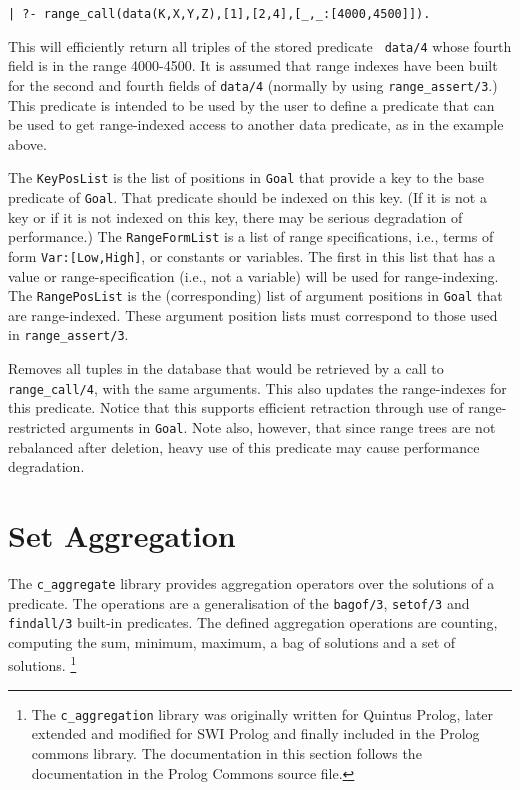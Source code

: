 \begin{description}
\begin{verbatim}
| ?- range_call(data(K,X,Y,Z),[1],[2,4],[_,_:[4000,4500]]).
\end{verbatim}

This will efficiently return all triples of the stored predicate {\tt
  data/4} whose fourth field is in the range 4000-4500.  It is assumed
that range indexes have been built for the second and fourth fields of
{\tt data/4} (normally by using {\tt range\_assert/3}.)  This
predicate is intended to be used by the user to define a predicate
that can be used to get range-indexed access to another data
predicate, as in the example above.

The {\tt KeyPosList} is the list of positions in {\tt Goal} that
provide a key to the base predicate of {\tt Goal}.  That predicate
should be indexed on this key.  (If it is not a key or if it is not
indexed on this key, there may be serious degradation of performance.)
The {\tt RangeFormList} is a list of range specifications, i.e., terms
of form {\tt Var:[Low,High]}, or constants or variables.  The first in
this list that has a value or range-specification (i.e., not a
variable) will be used for range-indexing.  The {\tt RangePosList} is
the (corresponding) list of argument positions in {\tt Goal} that are
range-indexed.  These argument position lists must correspond to those
used in {\tt range\_assert/3}. 

%
Removes all tuples in the database that would be retrieved by a call
to {\tt range\_call/4}, with the same arguments.  This also updates
the range-indexes for this predicate.  Notice that this supports
efficient retraction through use of range-restricted arguments in
{\tt Goal}.  Note also, however, that since range trees are not
rebalanced after deletion, heavy use of this predicate may cause
performance degradation.  

\end{description}

\section{Set Aggregation}

The {\tt c\_aggregate} library provides aggregation operators over the
solutions of a predicate. The operations are a generalisation of the
{\tt bagof/3}, {\tt setof/3} and {\tt findall/3} built-in
predicates. The defined aggregation operations are counting, computing
the sum, minimum, maximum, a bag of solutions and a set of
solutions. \footnote{The {\tt c\_aggregation} library was originally
  written for Quintus Prolog, later extended and modified for SWI
  Prolog and finally included in the Prolog commons library. The
  documentation in this section follows the documentation in the
  Prolog Commons source file.}

